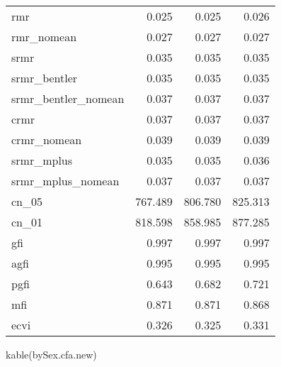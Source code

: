 \documentclass[
  letterpaper,
  DIV=11,
  numbers=noendperiod]{scrartcl}
\newenvironment{Shaded}{\begin{snugshade}}{\end{snugshade}}
\newcommand{\FunctionTok}[1]{\textcolor[rgb]{0.28,0.35,0.67}{#1}}
\newcommand{\NormalTok}[1]{\textcolor[rgb]{0.00,0.23,0.31}{#1}}
\begin{document}
\begin{longtable}[]{@{}lrrr@{}}
rmr & 0.025 & 0.025 & 0.026 \\
rmr\_nomean & 0.027 & 0.027 & 0.027 \\
srmr & 0.035 & 0.035 & 0.035 \\
srmr\_bentler & 0.035 & 0.035 & 0.035 \\
srmr\_bentler\_nomean & 0.037 & 0.037 & 0.037 \\
crmr & 0.037 & 0.037 & 0.037 \\
crmr\_nomean & 0.039 & 0.039 & 0.039 \\
srmr\_mplus & 0.035 & 0.035 & 0.036 \\
srmr\_mplus\_nomean & 0.037 & 0.037 & 0.037 \\
cn\_05 & 767.489 & 806.780 & 825.313 \\
cn\_01 & 818.598 & 858.985 & 877.285 \\
gfi & 0.997 & 0.997 & 0.997 \\
agfi & 0.995 & 0.995 & 0.995 \\
pgfi & 0.643 & 0.682 & 0.721 \\
mfi & 0.871 & 0.871 & 0.868 \\
ecvi & 0.326 & 0.325 & 0.331 \\
\end{longtable}

\begin{Shaded}
\begin{Highlighting}[]
\FunctionTok{kable}\NormalTok{(bySex.cfa.new)}
\end{Highlighting}
\end{Shaded}
\end{document}

